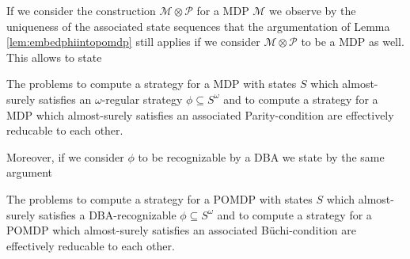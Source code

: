 If we consider the construction $\mathcal{M}\otimes\mathcal{P}$ for a \ac{MDP}
$\mathcal{M}$ we observe by the uniqueness of the associated state sequences
that the argumentation of Lemma \ref{lem:embedphiintopomdp} still applies if we
consider $\mathcal{M}\otimes\mathcal{P}$ to be a \ac{MDP} as well. This allows
to state
\begin{corollary}
  The problems to compute a strategy for a \ac{MDP} with states $S$ which
  almost-surely satisfies an $\omega$-regular strategy
  $\phi\subseteq S^{\omega}$ and to compute a strategy for a \ac{MDP} which
  almost-surely satisfies an associated Parity-condition are effectively
  reducable to each other.
  \label{thm:MDPomegareg}
\end{corollary}
Moreover, if we consider $\phi$ to be recognizable by a \ac{DBA} we state by
the same argument
\begin{corollary}
  The problems to compute a strategy for a \ac{POMDP} with states $S$ which
  almost-surely satisfies a \ac{DBA}-recognizable $\phi\subseteq S^{\omega}$
  and to compute a strategy for a \ac{POMDP} which almost-surely satisfies an
  associated Büchi-condition are effectively reducable to each other.
  \label{cor:POMDPDBA}
\end{corollary}

